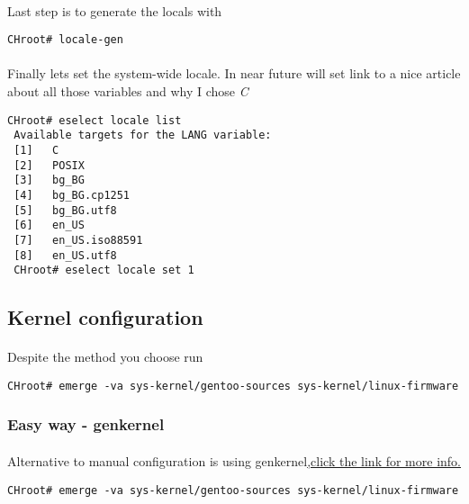 \documentclass[10pt,a4paper]{article}
\begin{document}
\begin{enumerate}

                    
                    \paragraph{} Last step is to generate the locals with
                    
\begin{lstlisting}[style=BashInputCHRoot]
 CHroot# locale-gen
\end{lstlisting}      
                    
                    \paragraph{} Finally lets set the system-wide locale. In near future will set link to a nice article about all those variables and why I chose \textit{C}

\begin{lstlisting}[style=BashInputCHRoot]
 CHroot# eselect locale list
 Available targets for the LANG variable:
 [1]   C
 [2]   POSIX
 [3]   bg_BG
 [4]   bg_BG.cp1251
 [5]   bg_BG.utf8
 [6]   en_US
 [7]   en_US.iso88591
 [8]   en_US.utf8
 CHroot# eselect locale set 1
\end{lstlisting}                        
                    
                \end{enumerate}

        \newpage
        \subsection{Kernel configuration}
            
            \paragraph{} Despite the method you choose run

\begin{lstlisting}[style=BashInputCHRoot]
 CHroot# emerge -va sys-kernel/gentoo-sources sys-kernel/linux-firmware
\end{lstlisting}
            
            \newpage 
            \subsubsection{Easy way - genkernel}
            
                \paragraph{} Alternative to manual configuration is using genkernel\href{https://wiki.gentoo.org/wiki/Handbook:AMD64/Installation/Kernel#Optional:_Building_an_initramfs}{,click the link for more info.}
\begin{lstlisting}[style=BashInputCHRoot]
CHroot# emerge -va sys-kernel/gentoo-sources sys-kernel/linux-firmware
\end{lstlisting}            
            
\end{document}
